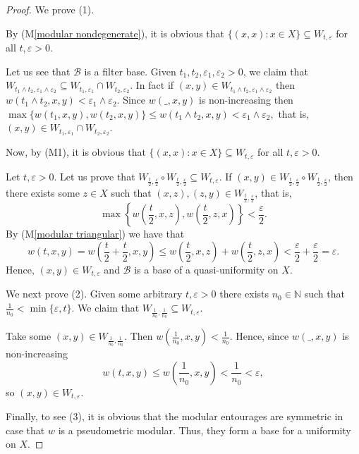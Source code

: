 \documentclass[11pt,a4paper]{amsart}
\theoremstyle{definition}
\begin{document}
	\begin{proof}
		We prove (1).
		
		By (M\ref{modular nondegenerate}), it is obvious that $\{(x,x):x\in X\}\subseteq W_{t,\varepsilon}$ for all $t,\varepsilon>0.$
		
		Let us see that $\mathcal{B}$ is a filter base.
		Given $t_1,t_2,\varepsilon_1,\varepsilon_2>0$, we claim that $W_{t_1\wedge t_2,\varepsilon_1\wedge \varepsilon_2}\subseteq W_{t_1,\varepsilon_1}\cap W_{t_2,\varepsilon_2}$. In fact if $(x,y)\in W_{t_1\wedge t_2,\varepsilon_1\wedge \varepsilon_2}$ then $w(t_1\wedge t_2,x,y)<\varepsilon_1\wedge \varepsilon_2.$
		Since $w(\_,x,y)$ is non-increasing then $\max\{w(t_1,x,y),w(t_2,x,y)\}\leq w(t_1\wedge t_2,x,y)<\varepsilon_1\wedge \varepsilon_2,$
		that is, $(x,y)\in W_{t_1,\varepsilon_1}\cap W_{t_2,\varepsilon_2}$.
		
		Now, by (M1), it is obvious that $\{(x,x):x\in X\}\subseteq W_{t,\varepsilon}$ for all $t,\varepsilon>0.$
		
		Let $t,\varepsilon>0$. Let us prove that $W_{\frac{t}{2},\frac{\varepsilon}{2}}\circ W_{\frac{t}{2},\frac{\varepsilon}{2}}\subseteq W_{t,\varepsilon}$. If $(x,y)\in W_{\frac{t}{2},\frac{\varepsilon}{2}}\circ W_{\frac{t}{2},\frac{\varepsilon}{2}}$, then there exists some $z\in X$ such that $(x,z),(z,y)\in W_{\frac{t}{2},\frac{\varepsilon}{2}}$, that is,
		\[\max\left\{w\left(\frac{t}{2},x,z\right),w\left(\frac{t}{2},z,x\right)\right\}<\frac{\varepsilon}{2}.\]
		By (M\ref{modular triangular}) we have that
		\[w(t,x,y)=w\left(\frac{t}{2}+\frac{t}{2},x,y\right)\leq w\left(\frac{t}{2},x,z\right)+w\left(\frac{t}{2},z,x\right)<\frac{\varepsilon}{2}+\frac{\varepsilon}{2}=\varepsilon.\]
		Hence, $(x,y)\in W_{t,\varepsilon}$ and $\mathcal{B}$ is a base of a quasi-uniformity on $X.$
		
		We next prove (2). Given some arbitrary $t,\varepsilon>0$ there exists $n_0\in\mathbb{N}$ such that $\frac{1}{n_0}<\min\{\varepsilon, t\}$. We claim that $W_{\frac{1}{n_0},\frac{1}{n_0}}\subseteq W_{t,\varepsilon}$.
		
		Take some $(x,y)\in W_{\frac{1}{n_0},\frac{1}{n_0}}$. Then $w\left(\frac{1}{n_0},x,y\right)<\frac{1}{n_0}$. Hence, since $w(\_,x,y)$ is non-increasing
		\[w(t,x,y)\leq w\left(\frac{1}{n_0},x,y\right)<\frac{1}{n_0}< \varepsilon,\]
		so $(x,y)\in W_{t,\varepsilon}$.
		
		Finally, to see (3), it is obvious that the modular entourages are symmetric in case that $w$ is a pseudometric modular. Thus, they form a base for a uniformity on $X$.
	\end{proof}
	
\end{document}
